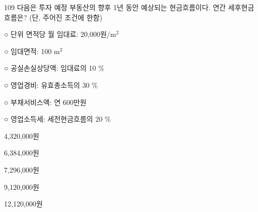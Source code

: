 \begin{question}{109}
다음은 투자 예정 부동산의 향후 1년 동안 예상되는 현금흐름이다. 연간 세후현금흐름은? (단, 주어진 조건에 한함)
\begin{framedtext}
○ 단위 면적당 월 임대료: 20,000원/m$^2$ \par
○ 임대면적: 100 m$^2$ \par
○ 공실손실상당액: 임대료의 10 \% \par
○ 영업경비: 유효총소득의 30 \% \par
○ 부채서비스액: 연 600만원 \par
○ 영업소득세: 세전현금흐름의 20 \% \par
\end{framedtext}
\begin{choices}
  \item 4,320,000원
  \item 6,384,000원
  \item 7,296,000원
  \item 9,120,000원
  \item 12,120,000원
\end{choices}
\end{question}
